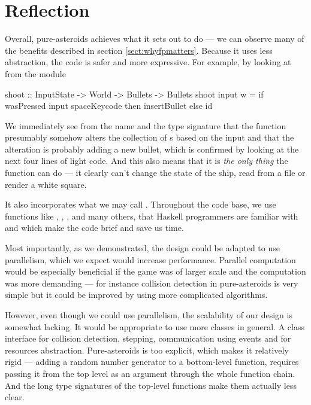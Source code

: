 \documentclass[
  digital, %
  color,   %
  table,   %
  oneside, %
  lof,     %
  lot,     %
]{fithesis3}
\begin{document}
{%
\section{Reflection}
\label{sect:purereflection}

Overall, pure-asteroids achieves what it sets out to do --- we can observe
many of the benefits described in section \ref{sect:whyfpmatters}.
Because it uses less abstraction, the code is safer and more expressive.
For example, by looking at  from the  module
\begin{haskell}
shoot :: InputState -> World -> Bullets -> Bullets
shoot input w =
    if wasPressed input spaceKeycode
        then insertBullet
        else id
\end{haskell}
We immediately see from the name and the type signature that the function presumably
somehow alters the collection of s based on the input and that
the alteration is probably adding a new bullet, which is confirmed by looking
at the next four lines of light code. And this also means that it is \emph{the only thing}
the function can do --- it clearly can't change the state of the ship, read from a file
or render a white square.

It also incorporates what we may call .
Throughout the code base, we use functions like , ,
,  and many others, that Haskell programmers are familiar
with and which make the code brief and save us time.

Most importantly, as we demonstrated, the design could be adapted to
use parallelism, which we expect would increase performance.
Parallel computation would be especially beneficial if the game was of larger scale
and the computation was more demanding --- for instance collision detection
in pure-asteroids is very simple but it could be improved by using more
complicated algorithms.

However, even though we could use parallelism, the scalability of our design is somewhat lacking.
It would be appropriate to use more classes in general. A class interface for
collision detection, stepping, communication using events and for resources abstraction.
Pure-asteroids is too explicit, which makes it relatively rigid
--- adding a random number
generator to a bottom-level function, requires passing it from the top level
as an argument through the whole function chain. And the long type signatures of the
top-level functions make them actually less clear.

}
\end{document}
